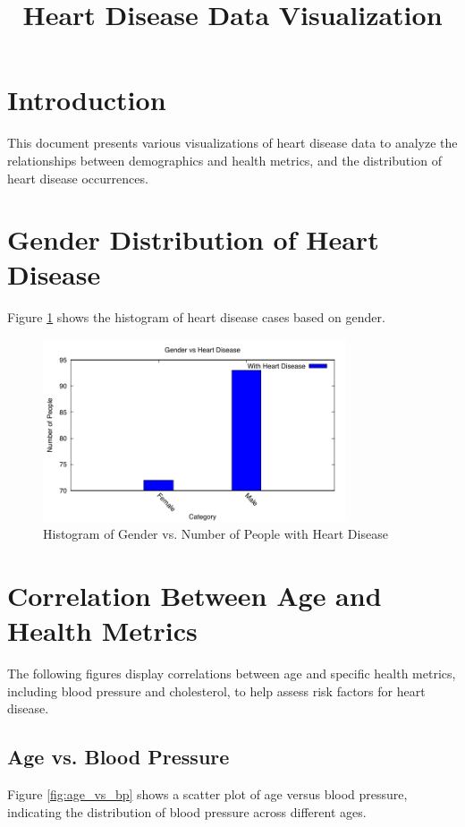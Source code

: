 \documentclass{article}
\title{Heart Disease Data Visualization}
\author{}
\date{}
\begin{document}
\maketitle

\section{Introduction}
This document presents various visualizations of heart disease data to analyze the relationships between demographics and health metrics, and the distribution of heart disease occurrences.

\section{Gender Distribution of Heart Disease}
Figure \ref{fig:gender_histogram} shows the histogram of heart disease cases based on gender.

\begin{figure}[h]
    \centering
    \includegraphics[width=0.8\textwidth]{gender_vs_heart_disease_histogram.pdf}
    \caption{Histogram of Gender vs. Number of People with Heart Disease}
    \label{fig:gender_histogram}
\end{figure}

\section{Correlation Between Age and Health Metrics}

The following figures display correlations between age and specific health metrics, including blood pressure and cholesterol, to help assess risk factors for heart disease.

\subsection{Age vs. Blood Pressure}
Figure \ref{fig:age_vs_bp} shows a scatter plot of age versus blood pressure, indicating the distribution of blood pressure across different ages.
\end{document}
